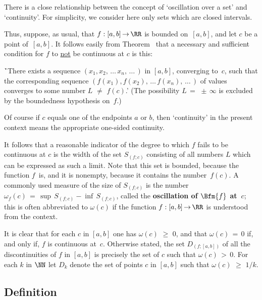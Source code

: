 \VV

        There is a close relationship between the concept of `oscillation over a set' and `continuity'. For simplicity, we consider here only sets which are closed intervals.

        Thus, suppose, as usual, that $f:[a,b] \,{\rightarrow}\, {\RR}$ is bounded on~$[a,b]$, and let $c$ be a point of~$[a,b]$.
    It follows easily from Theorem~ that a necessary and sufficient condition for $f$ to \underline{not} be continuous at $c$ is this:

\VA

        \h `There exists a sequence $(x_{1},x_{2},\,{\ldots}\,x_{n},\,{\ldots}\,)$ in $[a,b]$, converging to~$c$,
    such that the corresponding sequence $(f(x_{1}),f(x_{2}),\,{\ldots}\,f(x_{n}),\,{\ldots}\,)$ of values converges to some number $L \,\,{\neq}\,\, f(c)$.'
    (The possibility $L \,=\,  \,{\pm}\, {\infty}$ is excluded by the boundedness hypothesis on~$f$.)

\VA

    Of course if $c$ equals one of the endpoints $a$ or $b$, then `continuity' in the present context means the appropriate one-sided continuity.

\V

        It follows that a reasonable indicator of the degree to which $f$ fails to be continuous at $c$ is the width of the set $S_{(f;c)}$
    consisting of all numbers $L$ which can be expressed as such a limit. Note that this set is bounded, because the function $f$~is, and it is nonempty, because it contains the number~$f(c)$.
    A commonly used measure of the size of $S_{(f;c)}$ is the number ${\omega}_{f}(c) \,=\, {\sup}\,S_{(f;c)} - {\inf}\,S_{(f;c)}$, called the {\bf oscillation of $\Bfm{f}$ at~$c$};
    this is often abbreviated to ${\omega}(c)$ if the function $f:[a,b] \,{\rightarrow}\, {\RR}$ is understood from the context.

        It is clear that for each $c$ in $[a,b]$ one has ${\omega}(c)\,\,{\geq}\,\,0$, and that ${\omega}(c) \,=\, 0$ if, and only if, $f$ is continuous at~$c$.
    Otherwise stated, the set $D_{(f;[a,b])}$ of all the discontinuities of $f$ in $[a,b]$ is precisely the set of $c$ such that ${\omega}(c)\,>\,0$.
    For each $k$ in ${\NN}$ let $D_{k}$ denote the set of points $c$ in $[a,b]$ such that ${\omega}(c)\,\,{\geq}\,\,1/k$.

\V

        \subsection{\small{{\bf Definition}}}
        \label{DefH20.55}

